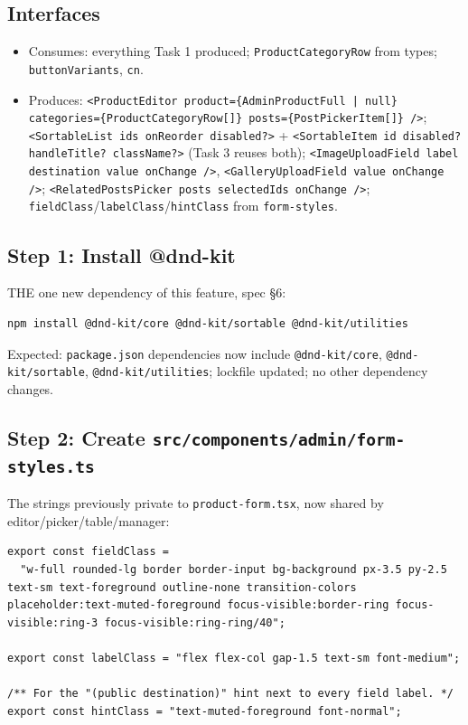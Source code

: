 \documentclass[11pt,a4paper]{article}
\begin{document}
\subsection*{Interfaces}
\begin{itemize}
  \item Consumes: everything Task 1 produced; \texttt{ProductCategoryRow} from types;
        \texttt{buttonVariants}, \texttt{cn}.
  \item Produces:
        \lstinline!<ProductEditor product={AdminProductFull | null} categories={ProductCategoryRow[]} posts={PostPickerItem[]} />!;
        \lstinline!<SortableList ids onReorder disabled?>! +
        \lstinline!<SortableItem id disabled? handleTitle? className?>! (Task 3 reuses both);
        \lstinline!<ImageUploadField label destination value onChange />!,
        \lstinline!<GalleryUploadField value onChange />!;
        \lstinline!<RelatedPostsPicker posts selectedIds onChange />!;
        \texttt{fieldClass}/\texttt{labelClass}/\texttt{hintClass} from \texttt{form-styles}.
\end{itemize}

\subsection*{Step 1: Install @dnd-kit}

THE one new dependency of this feature, spec \S6:

\begin{lstlisting}
npm install @dnd-kit/core @dnd-kit/sortable @dnd-kit/utilities
\end{lstlisting}

Expected: \texttt{package.json} dependencies now include \texttt{@dnd-kit/core},
\texttt{@dnd-kit/sortable}, \texttt{@dnd-kit/utilities}; lockfile updated; no other dependency changes.

\subsection*{Step 2: Create \texttt{src/components/admin/form-styles.ts}}

The strings previously private to \texttt{product-form.tsx}, now shared by editor/picker/table/manager:

\begin{lstlisting}
export const fieldClass =
  "w-full rounded-lg border border-input bg-background px-3.5 py-2.5 text-sm text-foreground outline-none transition-colors placeholder:text-muted-foreground focus-visible:border-ring focus-visible:ring-3 focus-visible:ring-ring/40";

export const labelClass = "flex flex-col gap-1.5 text-sm font-medium";

/** For the "(public destination)" hint next to every field label. */
export const hintClass = "text-muted-foreground font-normal";
\end{lstlisting}
\end{document}
